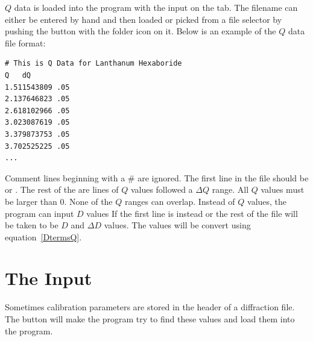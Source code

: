 $Q$ data is loaded into the program with the 
input on the  tab. The filename can either 
be entered by hand and then loaded or picked from a file selector 
by pushing the button with the folder icon on it.  Below is an example 
of the $Q$ data file format: 
\begin{lstlisting}
# This is Q Data for Lanthanum Hexaboride
Q   dQ
1.511543809 .05
2.137646823 .05
2.618102966 .05
3.023087619 .05
3.379873753 .05
3.702525225 .05
...
\end{lstlisting}
Comment lines beginning with a \# are ignored. The
first line in the file should be  or 
. The 
rest of the are lines of $Q$ values followed a $\Delta Q$ range.
All $Q$ values must be larger than 0. None of the $Q$ ranges can 
overlap. Instead of $Q$ values, the program can input $D$ values 
If the first line is instead  or  the rest of 
the file will be taken to be $D$ and $\Delta D$ values.
The values will be convert using equation~\ref{DtermsQ}. 

\section{\texorpdfstring{The  Input}
    {The ''Get From Header'' Input}}

Sometimes calibration parameters are stored in the header of
a diffraction file.  The  button will 
make the program try to find these values and load them into the 
program.
